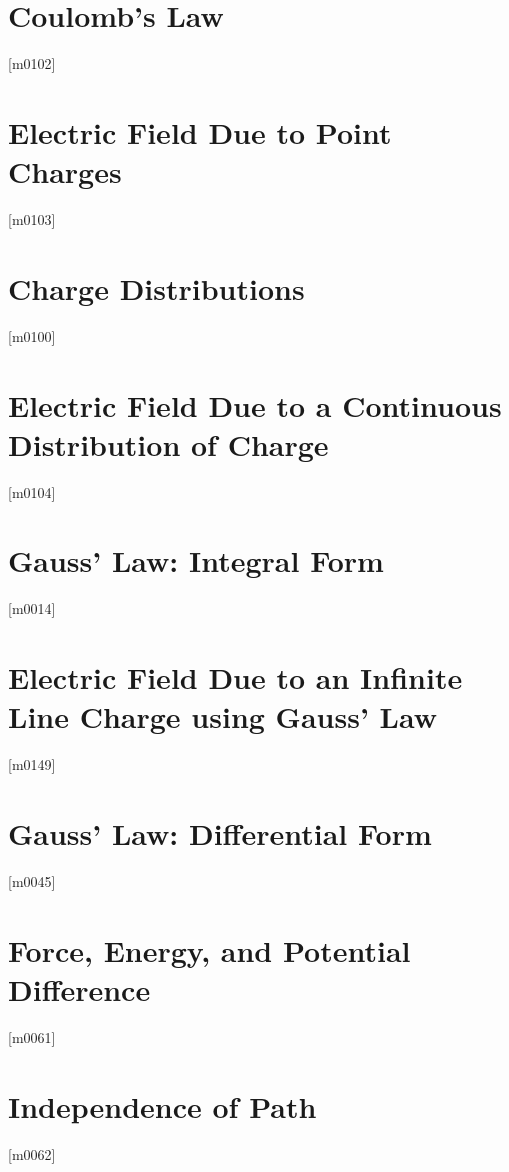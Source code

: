 \documentclass[10pt,letterpaper,twocolumn,openany]{book}
\theoremstyle{definition} %
\begin{document}
    \section{Coulomb's Law}
{\color{blue}\tiny[m0102]}      
      \vfill\break
    \section{Electric Field Due to Point Charges}
{\color{blue}\tiny[m0103]}      
      \vfill\break
    \section{Charge Distributions}
{\color{blue}\tiny[m0100]}      
      \vfill\break
    \section{Electric Field Due to a Continuous Distribution of Charge}
{\color{blue}\tiny[m0104]}      
      \vfill\break
    \section{Gauss' Law: Integral Form}
{\color{blue}\tiny[m0014]}      
      \vfill\break
    \section{Electric Field Due to an Infinite Line Charge using Gauss' Law}
{\color{blue}\tiny[m0149]}      
      \vfill\break
    \section{Gauss' Law: Differential Form}
{\color{blue}\tiny[m0045]}      
      \vfill\break
    \section{Force, Energy, and Potential Difference}
{\color{blue}\tiny[m0061]}      
      \vfill\break
    \section{Independence of Path}
{\color{blue}\tiny[m0062]}      
      \vfill\break
\end{document}
